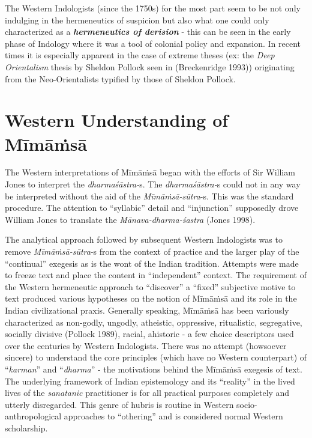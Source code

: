 The Western Indologists (since the 1750s) for the most part seem to be not only indulging in the hermeneutics of suspicion but also what one could only characterized as a \textbf{\textit{hermeneutics of derision}} - this can be seen in the early phase of Indology where it was a tool of colonial policy and expansion. In recent times it is especially apparent in the case of extreme theses (ex: the \textit{Deep Orientalism} thesis by Sheldon Pollock seen in (Breckenridge 1993)) originating from the Neo-Orientalists typified by those of Sheldon Pollock.


\section*{Western Understanding of Mīmāṁsā}

The Western interpretations of Mīmāṁsā began with the efforts of Sir William Jones to interpret the \textit{dharmaśāstra-}s. The \textit{dharmaśāstra-}s could not in any way be interpreted without the aid of the \textit{Mīmāṁsā-sūtra}-s. This was the standard procedure. The attention to “syllabic” detail and “injunction” supposedly drove William Jones to translate the \textit{Mānava-dharma-śastra} (Jones 1998).

The analytical approach followed by subsequent Western Indologists was to remove \textit{Mīmāṁsā-sūtra}-s from the context of practice and the larger play of the “continual” exegesis as is the wont of the Indian tradition. Attempts were made to freeze text and place the content in “independent” context. The requirement of the Western hermeneutic approach to “discover” a “fixed” subjective motive to text produced various hypotheses on the notion of Mīmāṁsā and its role in the Indian civilizational praxis. Generally speaking, Mīmāṁsā has been variously characterized as non-godly, ungodly, atheistic, oppressive, ritualistic, segregative, socially divisive (Pollock 1989), racial, ahistoric - a few choice descriptors used over the centuries by Western Indologists. There was no attempt (howsoever sincere) to understand the core principles (which have no Western counterpart) of “\textit{karman}” and “\textit{dharma}” - the motivations behind the Mīmāṁsā exegesis of text. The underlying framework of Indian epistemology and its “reality” in the lived lives of the \textit{sanatanic} practitioner is for all practical purposes completely and utterly disregarded. This genre of hubris is routine in Western socio-anthropological approaches to “othering” and is considered normal Western scholarship. 

